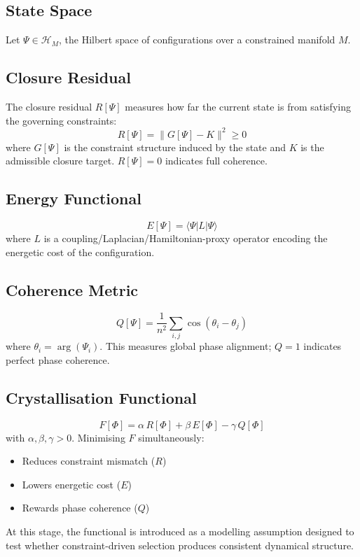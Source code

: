 \documentclass[12pt]{article}
\begin{document}
\subsection{State Space}

Let $\Psi \in \mathcal{H}_M$, the Hilbert space of configurations over a constrained manifold $M$.

\subsection{Closure Residual}

The closure residual $R[\Psi]$ measures how far the current state is from satisfying the governing constraints:
\begin{equation}
R[\Psi] = \|G[\Psi] - K\|^2 \geq 0
\end{equation}
where $G[\Psi]$ is the constraint structure induced by the state and $K$ is the admissible closure target. $R[\Psi] = 0$ indicates full coherence.

\subsection{Energy Functional}

\begin{equation}
E[\Psi] = \langle \Psi | L | \Psi \rangle
\end{equation}
where $L$ is a coupling/Laplacian/Hamiltonian-proxy operator encoding the energetic cost of the configuration.

\subsection{Coherence Metric}

\begin{equation}
Q[\Psi] = \frac{1}{n^2} \sum_{i,j} \cos(\theta_i - \theta_j)
\end{equation}
where $\theta_i = \arg(\Psi_i)$. This measures global phase alignment; $Q = 1$ indicates perfect phase coherence.

\subsection{Crystallisation Functional}

\begin{equation}
F[\Phi] = \alpha\, R[\Phi] + \beta\, E[\Phi] - \gamma\, Q[\Phi]
\end{equation}
with $\alpha, \beta, \gamma > 0$. Minimising $F$ simultaneously:
\begin{itemize}
    \item Reduces constraint mismatch ($R$)
    \item Lowers energetic cost ($E$)
    \item Rewards phase coherence ($Q$)
\end{itemize}
At this stage, the functional is introduced as a modelling assumption designed to test whether constraint-driven selection produces consistent dynamical structure.
\end{document}
